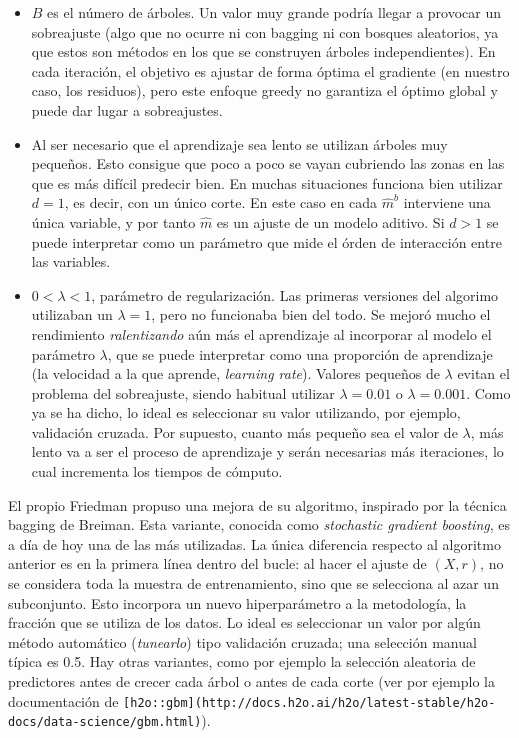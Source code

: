 \documentclass[]{book}
\theoremstyle{break}
\theoremstyle{definition}
\theoremstyle{definition}
\theoremstyle{definition}
\theoremstyle{remark}
\begin{document}
\begin{itemize}
\item
  \(B\) es el número de árboles. Un valor muy grande podría llegar a
  provocar un sobreajuste (algo que no ocurre ni con bagging ni con
  bosques aleatorios, ya que estos son métodos en los que se construyen
  árboles independientes). En cada iteración, el objetivo es ajustar de
  forma óptima el gradiente (en nuestro caso, los residuos), pero este
  enfoque greedy no garantiza el óptimo global y puede dar lugar a
  sobreajustes.
\item
  Al ser necesario que el aprendizaje sea lento se utilizan árboles muy
  pequeños. Esto consigue que poco a poco se vayan cubriendo las zonas
  en las que es más difícil predecir bien. En muchas situaciones
  funciona bien utilizar \(d = 1\), es decir, con un único corte. En
  este caso en cada \(\hat m^b\) interviene una única variable, y por
  tanto \(\hat m\) es un ajuste de un modelo aditivo. Si \(d>1\) se
  puede interpretar como un parámetro que mide el órden de interacción
  entre las variables.
\item
  \(0 < \lambda < 1\), parámetro de regularización. Las primeras
  versiones del algorimo utilizaban un \(\lambda = 1\), pero no
  funcionaba bien del todo. Se mejoró mucho el rendimiento
  \emph{ralentizando} aún más el aprendizaje al incorporar al modelo el
  parámetro \(\lambda\), que se puede interpretar como una proporción de
  aprendizaje (la velocidad a la que aprende, \emph{learning rate}).
  Valores pequeños de \(\lambda\) evitan el problema del sobreajuste,
  siendo habitual utilizar \(\lambda = 0.01\) o \(\lambda = 0.001\).
  Como ya se ha dicho, lo ideal es seleccionar su valor utilizando, por
  ejemplo, validación cruzada. Por supuesto, cuanto más pequeño sea el
  valor de \(\lambda\), más lento va a ser el proceso de aprendizaje y
  serán necesarias más iteraciones, lo cual incrementa los tiempos de
  cómputo.
\end{itemize}

El propio Friedman propuso una mejora de su algoritmo, inspirado por la
técnica bagging de Breiman. Esta variante, conocida como
\emph{stochastic gradient boosting}, es a día de hoy una de las más
utilizadas. La única diferencia respecto al algoritmo anterior es en la
primera línea dentro del bucle: al hacer el ajuste de \((X, r)\), no se
considera toda la muestra de entrenamiento, sino que se selecciona al
azar un subconjunto. Esto incorpora un nuevo hiperparámetro a la
metodología, la fracción que se utiliza de los datos. Lo ideal es
seleccionar un valor por algún método automático (\emph{tunearlo}) tipo
validación cruzada; una selección manual típica es 0.5. Hay otras
variantes, como por ejemplo la selección aleatoria de predictores antes
de crecer cada árbol o antes de cada corte (ver por ejemplo la
documentación de
\texttt{{[}h2o::gbm{]}(http://docs.h2o.ai/h2o/latest-stable/h2o-docs/data-science/gbm.html)}).
\end{document}
